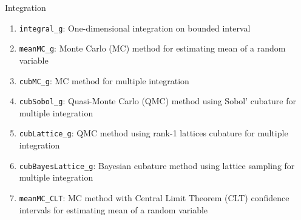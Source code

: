 \documentclass[final]{beamer}
\newlength{\sepwid}
\newlength{\onecolwid}
\newlength{\twocolwid}
\begin{document}
\begin{frame}[t]
\begin{columns}[t]
\begin{column}{\twocolwid}
\begin{columns}[t,totalwidth=\twocolwid]
\begin{column}{\onecolwid}
\begin{block}{Integration}
\begin{enumerate}
\item \texttt{integral\_g}: One-dimensional integration on bounded interval \cite{ChoEtal18b}
\item \texttt{meanMC\_g}: Monte Carlo (MC) method for estimating mean of a random variable \cite{meanMCcubMC}
\item \texttt{cubMC\_g}: MC method for  multiple integration \cite{meanMCcubMC}
\item \texttt{cubSobol\_g}: Quasi-Monte Carlo (QMC) method using Sobol' cubature for multiple integration \cite{cubSobol}
\item \texttt{cubLattice\_g}: QMC method using rank-1 lattices cubature for multiple integration \cite{cubLattice}
\item \texttt{cubBayesLattice\_g}: Bayesian cubature method using lattice sampling for multiple integration \cite{cubBayesLattice}
\item \texttt{meanMC\_CLT}: MC method with Central Limit Theorem (CLT) confidence intervals for estimating mean of a random variable \cite{ChoEtal18b}
\end{enumerate}


\end{block}


\end{column} %

\end{columns} %






\begin{column}{\sepwid}\end{column}


\end{column}
\end{columns}
\end{frame}
\end{document}

